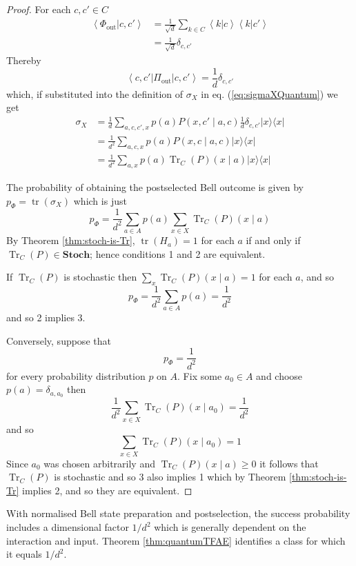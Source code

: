 \documentclass[10pt, a4paper]{article}
\newcommand{\braket}[2]{\left\langle{#1}|{#2}\right\rangle}
\newcommand{\ketbra}[2]{|{#1}\rangle\langle{#2}|}
\newcommand{\braOPket}[3]{\left\langle{#1}|{#2}|{#3}\right\rangle}
\newcommand{\Tr}[0]{\operatorname{Tr}}
\newcommand{\tr}[0]{\operatorname{tr}}
\begin{document}
\begin{proof}
    For each $c, c' \in C$
    \begin{align*}
        \braket{\Phi_{\mathrm{out}}}{c, c'} &= \frac{1}{\sqrt{d}} \sum_{k \in C} \braket{k}{c} \braket{k}{c'} \\
        &= \frac{1}{\sqrt{d}} \delta_{c, c'}
    \end{align*} Thereby 
    \begin{equation*}
        \braOPket{c, c'} {\Pi_{\mathrm{out}}} {c, c'} = \frac{1}{d} \delta_{c, c'}
    \end{equation*} which, if substituted into the definition of $\sigma_X$ in eq. (\ref{eq:sigmaXQuantum}) we get
    \begin{align*}
        \sigma_X &= \frac{1}{d} \sum_{a, c, c', x} p(a) P(x, c' \mid a, c) \frac{1}{d} \delta_{c, c'} \ketbra{x}{x} \\
        &= \frac{1}{d^2} \sum_{a, c, x} p(a) P(x, c \mid a, c) \ketbra{x}{x}\\
        &= \frac{1}{d^2} \sum_{a, x} p(a) \Tr_C(P)(x \mid a) \ketbra{x}{x} 
    \end{align*}

    The probability of obtaining the postselected Bell outcome is given by $p_\Phi = \tr(\sigma_X)$ which is just $$ p_\Phi = \frac{1}{d^2} \sum_{a \in A}p(a) \sum_{x \in X}\Tr_C(P)(x \mid a) $$ By Theorem \ref{thm:stoch-is-Tr}, $\tr (H_a) = 1$ for each $a$ if and only if $\Tr_C(P) \in \mathbf{Stoch}$; hence conditions 1 and 2 are equivalent. 

    If $\Tr_C(P)$ is stochastic then $\sum_{x}\Tr_C(P)(x \mid a) = 1$ for each $a$, and so $$ p_\Phi = \frac{1}{d^2} \sum_{a\in A} p(a) = \frac{1}{d^2} $$ and so 2 implies 3. 
    
    Conversely, suppose that $$ p_\Phi = \frac{1}{d^2} $$ for every probability distribution $p$ on $A$. Fix some $a_0 \in A$ and choose $p(a) = \delta_{a, a_0}$ then $$ \frac{1}{d^2} \sum_{x \in X} \Tr_C(P) (x \mid a_0) = \frac{1}{d^2} $$ and so $$\sum_{x \in X} \Tr_C(P)(x \mid a_0) = 1$$ Since $a_0$ was chosen arbitrarily and $\Tr_C(P)(x \mid a) \geq 0$ it follows that $\Tr_C(P)$ is stochastic and so 3 also implies 1 which by Theorem \ref{thm:stoch-is-Tr} implies 2, and so they are equivalent. 
\end{proof}

With normalised Bell state preparation and postselection, the success probability includes a dimensional factor $1/d^2$ which is generally dependent on the interaction and input. Theorem \ref{thm:quantumTFAE} identifies a class for which it equals $1/d^2$.
\end{document}
